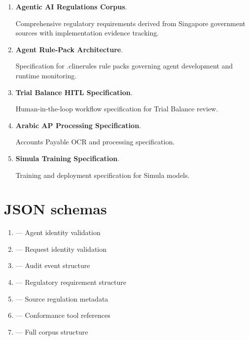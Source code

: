 \begin{enumerate}
  \item \textbf{Agentic AI Regulations Corpus}.
        
        Comprehensive regulatory requirements derived from Singapore government
        sources with implementation evidence tracking.
  
  \item \textbf{Agent Rule-Pack Architecture}.
        
        Specification for .clinerules rule packs governing agent development
        and runtime monitoring.
  
  \item \textbf{Trial Balance HITL Specification}.
        
        Human-in-the-loop workflow specification for Trial Balance review.
  
  \item \textbf{Arabic AP Processing Specification}.
        
        Accounts Payable OCR and processing specification.
  
  \item \textbf{Simula Training Specification}.
        
        Training and deployment specification for Simula models.
\end{enumerate}

\section{JSON schemas}

\begin{enumerate}
  \item {} ---
        Agent identity validation
  
  \item {} ---
        Request identity validation
  
  \item {} ---
        Audit event structure
  
  \item {} ---
        Regulatory requirement structure
  
  \item {} ---
        Source regulation metadata
  
  \item {} ---
        Conformance tool references
  
  \item {} ---
        Full corpus structure
\end{enumerate}


